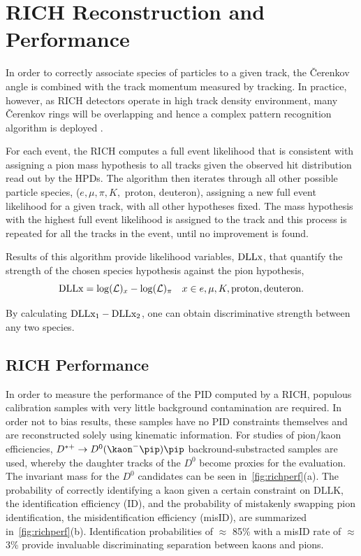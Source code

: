 \section{RICH Reconstruction and Performance }
In order to correctly associate species of particles to a given track, the \v{C}erenkov angle is combined with the track momentum measured by tracking. In practice, however, as \Gls{RICH} detectors operate in high track density environment, many \v{C}erenkov rings will be overlapping and hence a complex pattern recognition algorithm is deployed \cite{Forty:1999sg}. 


For each event, the \Gls{RICH} computes a full event likelihood that is consistent with assigning a pion mass hypothesis to all tracks given the observed hit distribution read out by the \Gls{HPD}s. The algorithm then iterates through all other possible particle species, ($e, \mu, \pi, K,$ proton, deuteron), assigning a new full event likelihood for a given track, with all other hypotheses fixed. The mass hypothesis with the highest full event likelihood is assigned to the track and this process is repeated for all the tracks in the event, until no improvement is found. 

Results of this algorithm provide likelihood variables, $\rm{\textrm{DLL{x}}}$, that quantify the strength of the chosen species hypothesis against the pion hypothesis,
\begin{equation}
	\textrm{\textrm{DLL{x}}} = \mathrm{log}(\mathcal{L})_{x} - \mathrm{log}(\mathcal{L})_{\pi} \quad  x\in{e, \mu, K, \rm{proton, deuteron}}.
\end{equation}

By calculating $\rm{DLL{x_{1}} - DLL{x_{2}}}$, one can obtain discriminative strength between any two species.

\subsection{RICH Performance}
\label{RICHperf}
In order to measure the performance of the \Gls{PID} computed by a \gls{RICH}, populous calibration samples with very little background contamination are required. In order not to bias results, these samples have no \Gls{PID} constraints themselves and are reconstructed solely using kinematic information. For studies of pion/kaon efficiencies, $D^{*+} \to D^{0}(\kaon^{-}\pip)\pip$ backround-substracted samples are used, whereby the daughter tracks of the $D^{0}$ become proxies for the evaluation. The invariant mass for the $D^{0}$ candidates can be seen in~\autoref{fig:richperf}(a). The probability of correctly identifying a kaon given a certain constraint on $\textrm{DLL{K}}$, the identification efficiency (\Gls{ID}), and the probability of mistakenly swapping pion identification, the misidentification efficiency (\gls{misID}), are summarized in~\autoref{fig:richperf}(b). Identification probabilities of $\approx$ 85\% with a misID rate of $\approx$ 3\% provide invaluable discriminating separation between kaons and pions.




